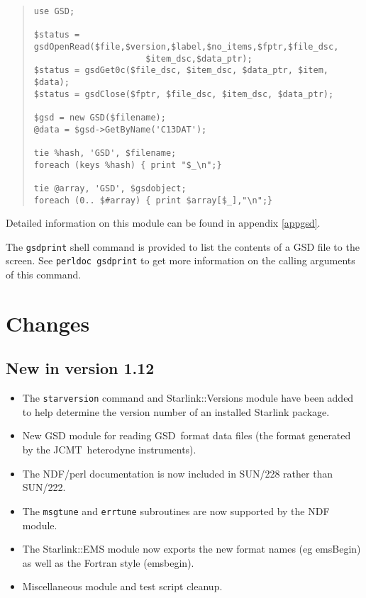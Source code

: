 \documentclass[twoside,11pt]{article}
\newenvironment{myquote}{\begin{quote}\begin{small}}{\end{small}\end{quote}}
\newcommand{\gsd}{\xref{{GSD}}{sun229}{}}
\newcommand{\jcmt}{\htmladdnormallink{JCMT}{http://www.jach.hawaii.edu/JACpublic/JCMT}}
\newcommand{\htmladdnormallink}[2]{#1}
\newcommand{\xref}[3]{#1}
\renewcommand{\_}{\texttt{\symbol{95}}}
\begin{document}
\begin{myquote}
\begin{verbatim}
use GSD;

$status = gsdOpenRead($file,$version,$label,$no_items,$fptr,$file_dsc,
                      $item_dsc,$data_ptr);
$status = gsdGet0c($file_dsc, $item_dsc, $data_ptr, $item, $data);
$status = gsdClose($fptr, $file_dsc, $item_dsc, $data_ptr);

$gsd = new GSD($filename);
@data = $gsd->GetByName('C13DAT');

tie %hash, 'GSD', $filename;
foreach (keys %hash) { print "$_\n";}

tie @array, 'GSD', $gsdobject;
foreach (0.. $#array) { print $array[$_],"\n";}
\end{verbatim}
\end{myquote}

Detailed information on this module can be found in appendix \ref{appgsd}.

The \texttt{gsdprint} shell command is provided to list the contents
of a GSD file to the screen. See \texttt{perldoc gsdprint} to get more
information on the calling arguments of this command.

\appendix

\section{Changes}

\subsection{New in version 1.12}

\begin{itemize}
\item The \texttt{starversion} command and Starlink::Versions module have 
been added to help determine the version number of an installed Starlink
package.

\item New GSD module for reading \gsd\ format data files (the format generated
  by the \jcmt\ heterodyne instruments).

\item The NDF/perl documentation is now included in SUN/228 rather than
  SUN/222.

\item The \texttt{msg\_tune} and \texttt{err\_tune} subroutines are now 
supported by the NDF module.

\item The Starlink::EMS module now exports the new format names (eg emsBegin)
  as well as the Fortran style (ems\_begin).

\item Miscellaneous module and test script cleanup.

\end{itemize}
\end{document}
